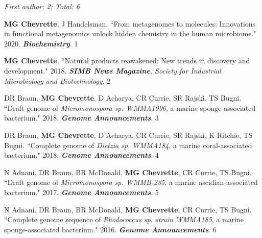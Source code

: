 \begin{cvpubs}

\cvpub
{\hspace{-1cm} \textit{First author: 2; Total: 6}}
{}

\cvpub
{\textbf{MG Chevrette}, J Handelsman. ``From metagenomes to molecules: Innovations in functional metagenomics unlock hidden chemistry in the human microbiome." 2020. \textit{\textbf{Biochemistry}}. \textbf{\textit{}}}
{1}

\cvpub
{\textbf{MG Chevrette}. ``Natural products reawakened: New trends in discovery and development." 2018. \textit{\textbf{SIMB News Magazine}, Society for Industrial Microbiology and Biotechnology}. }
{2}

\cvpub
{DR Braun, \textbf{MG Chevrette}, D Acharya, CR Currie, SR Rajski, TS Bugni. ``Draft genome of \textit{Micromonospora sp. WMMA1996}, a marine sponge-associated bacterium." 2018. \textit{\textbf{Genome Announcements}}. \textbf{\textit{}}}
{3}

\cvpub
{DR Braun, \textbf{MG Chevrette}, D Acharya, CR Currie, SR Rajski, K Ritchie, TS Bugni. ``Complete genome of \textit{Dietzia sp. WMMA184}, a marine coral-associated bacterium." 2018. \textit{\textbf{Genome Announcements}}. \textbf{\textit{}}}
{4}

\cvpub
{N Adnani, DR Braun, BR McDonald, \textbf{MG Chevrette}, CR Currie, TS Bugni. ``Draft genome of \textit{Micromonospora sp. WMMB-235}, a marine ascidian-associated bacterium." 2017. \textit{\textbf{Genome Announcements}}. \textbf{\textit{}}}
{5}

\cvpub
{N Adnani, DR Braun, BR McDonald, \textbf{MG Chevrette}, CR Currie, TS Bugni. ``Complete genome sequence of \textit{Rhodococcus sp. strain WMMA185}, a marine sponge-associated bacterium." 2016. \textit{\textbf{Genome Announcements}}. \textbf{\textit{}}}
{6}

\end{cvpubs}


 \vspace{-2mm}

